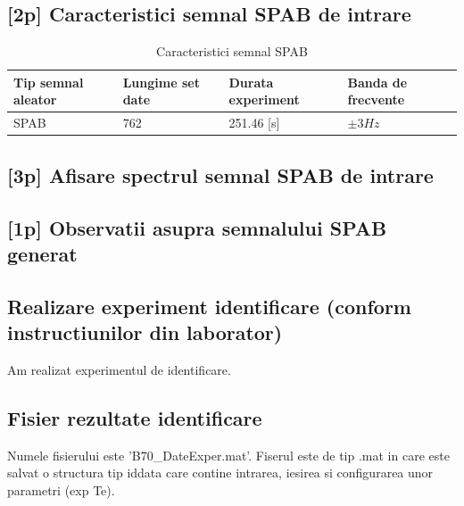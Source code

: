 \documentclass[12pt,english]{article}
\begin{document}
\subsection {[2p] Caracteristici semnal SPAB de intrare }
\begin{table}[H]
  \centering
  \begin{tabular}{|l|l|l|l|}
    \hline
    Tip semnal aleator & Lungime set date & Durata experiment & Banda de frecvente \\
    \hline
    SPAB & 762 & 251.46 [s] & $\pm 3Hz$ \\
    \hline
  \end{tabular}
  \caption{Caracteristici semnal SPAB}
\end{table}

\subsection {[3p] Afisare spectrul semnal SPAB de intrare }
\begin{center}
\end{center}

\subsection { [1p] Observatii asupra semnalului SPAB generat }
\subsection { Realizare experiment identificare (conform instructiunilor din laborator) }
Am realizat experimentul de identificare.
\subsection { Fisier rezultate identificare }
Numele fisierului este 'B70\_DateExper.mat'. Fiserul este de tip .mat in care este salvat o structura tip iddata care contine intrarea, iesirea si configurarea unor parametri (exp Te).
\end{document}
